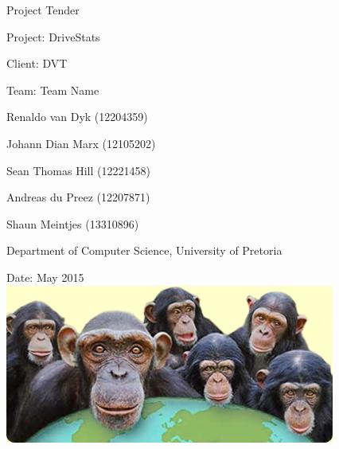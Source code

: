 \documentclass[12pt, oneside]{article}
\begin{document}
\thispagestyle{empty}
\begin{center}
\begin{minipage}{0.9\linewidth}
    \centering


    {\normalsize Project Tender\par}
    \vspace{1cm}
    {\Large Project: DriveStats\par}
{\normalsize Client: DVT\par}
    \vspace{1cm}
   {\Large Team: Team Name\par}
    {\normalsize Renaldo van Dyk (12204359)\par}
    {\normalsize Johann Dian Marx (12105202)\par}
    {\normalsize Sean Thomas Hill (12221458)\par}
    {\normalsize Andreas du Preez (12207871)\par}
    {\normalsize Shaun Meintjes (13310896)\par}
{\normalsize Department of Computer Science, University of Pretoria\par}
    \vspace{1cm}

 {\normalsize Date: May 2015}
\vspace{1cm}
    \includegraphics[scale=0.07]{example1} %

    \vspace{1cm}
    
\end{minipage}
\end{center}
\clearpage

\newpage
\end{document}
